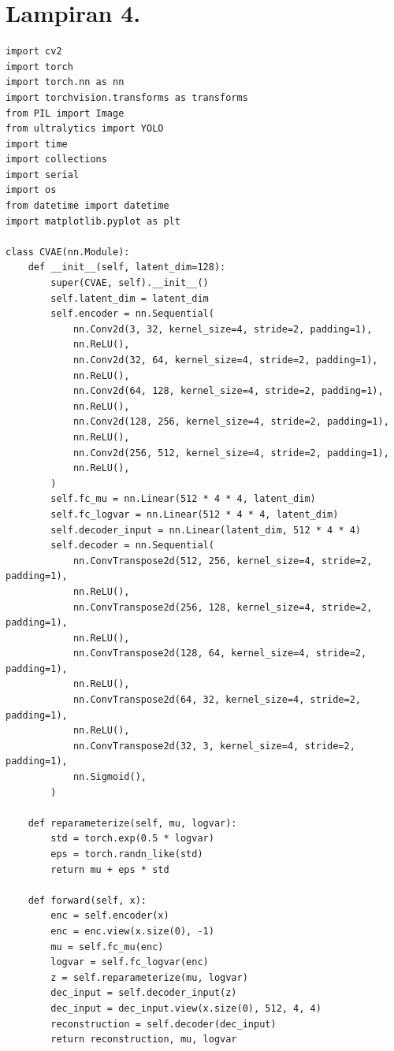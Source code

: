\section*{Lampiran 4. }
\label{Lampiran 4}
\begin{verbatim}
import cv2
import torch
import torch.nn as nn
import torchvision.transforms as transforms
from PIL import Image
from ultralytics import YOLO
import time
import collections
import serial
import os
from datetime import datetime
import matplotlib.pyplot as plt

class CVAE(nn.Module):
    def __init__(self, latent_dim=128):
        super(CVAE, self).__init__()
        self.latent_dim = latent_dim
        self.encoder = nn.Sequential(
            nn.Conv2d(3, 32, kernel_size=4, stride=2, padding=1),
            nn.ReLU(),
            nn.Conv2d(32, 64, kernel_size=4, stride=2, padding=1),
            nn.ReLU(),
            nn.Conv2d(64, 128, kernel_size=4, stride=2, padding=1),
            nn.ReLU(),
            nn.Conv2d(128, 256, kernel_size=4, stride=2, padding=1),
            nn.ReLU(),
            nn.Conv2d(256, 512, kernel_size=4, stride=2, padding=1),
            nn.ReLU(),
        )
        self.fc_mu = nn.Linear(512 * 4 * 4, latent_dim)
        self.fc_logvar = nn.Linear(512 * 4 * 4, latent_dim)
        self.decoder_input = nn.Linear(latent_dim, 512 * 4 * 4)
        self.decoder = nn.Sequential(
            nn.ConvTranspose2d(512, 256, kernel_size=4, stride=2, padding=1),
            nn.ReLU(),
            nn.ConvTranspose2d(256, 128, kernel_size=4, stride=2, padding=1),
            nn.ReLU(),
            nn.ConvTranspose2d(128, 64, kernel_size=4, stride=2, padding=1),
            nn.ReLU(),
            nn.ConvTranspose2d(64, 32, kernel_size=4, stride=2, padding=1),
            nn.ReLU(),
            nn.ConvTranspose2d(32, 3, kernel_size=4, stride=2, padding=1),
            nn.Sigmoid(),
        )

    def reparameterize(self, mu, logvar):
        std = torch.exp(0.5 * logvar)
        eps = torch.randn_like(std)
        return mu + eps * std

    def forward(self, x):
        enc = self.encoder(x)
        enc = enc.view(x.size(0), -1)
        mu = self.fc_mu(enc)
        logvar = self.fc_logvar(enc)
        z = self.reparameterize(mu, logvar)
        dec_input = self.decoder_input(z)
        dec_input = dec_input.view(x.size(0), 512, 4, 4)
        reconstruction = self.decoder(dec_input)
        return reconstruction, mu, logvar


\end{verbatim}
